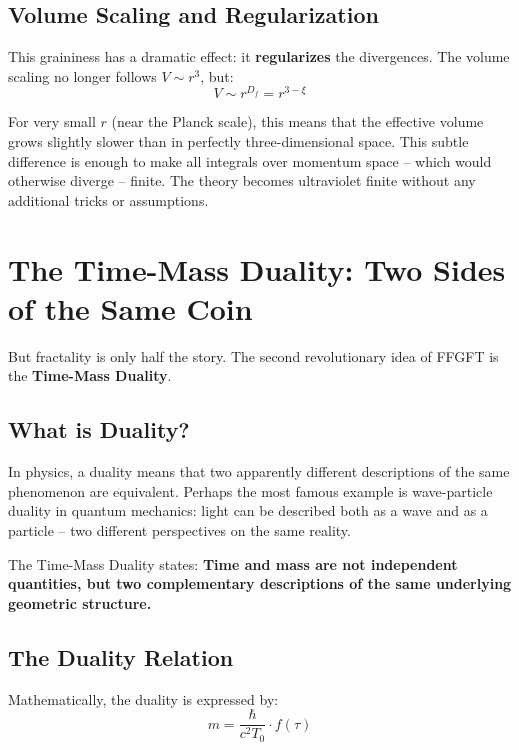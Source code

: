 \subsection{Volume Scaling and Regularization}

This graininess has a dramatic effect: it \textbf{regularizes} the divergences. The volume scaling no longer follows $V \sim r^3$, but:
\begin{equation}
V \sim r^{D_f} = r^{3-\xi}
\end{equation}

For very small $r$ (near the Planck scale), this means that the effective volume grows slightly slower than in perfectly three-dimensional space. This subtle difference is enough to make all integrals over momentum space -- which would otherwise diverge -- finite. The theory becomes ultraviolet finite without any additional tricks or assumptions.

\section{The Time-Mass Duality: Two Sides of the Same Coin}

But fractality is only half the story. The second revolutionary idea of FFGFT is the \textbf{Time-Mass Duality}.

\subsection{What is Duality?}

In physics, a duality means that two apparently different descriptions of the same phenomenon are equivalent. Perhaps the most famous example is wave-particle duality in quantum mechanics: light can be described both as a wave and as a particle -- two different perspectives on the same reality.

The Time-Mass Duality states: \textbf{Time and mass are not independent quantities, but two complementary descriptions of the same underlying geometric structure.}

\subsection{The Duality Relation}

Mathematically, the duality is expressed by:
\begin{equation}
m = \frac{\hbar}{c^2 T_0} \cdot f(\tau)
\end{equation}

